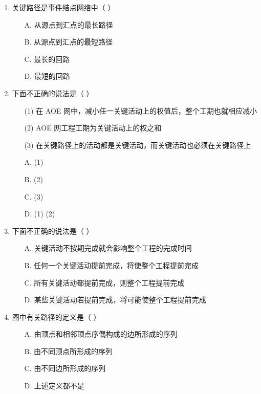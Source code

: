 \documentclass[12pt, a4paper]{article}
\begin{document}
\begin{enumerate}[label=\arabic*.]
	\item 关键路径是事件结点网络中（ ）
	      \begin{enumerate}
		      \item[A.] 从源点到汇点的最长路径
		      \item[B.] 从源点到汇点的最短路径
		      \item[C.] 最长的回路
		      \item[D.] 最短的回路
	      \end{enumerate}

	\item 下面不正确的说法是（ ）
	      \begin{enumerate}
		      \item[(1)] 在 AOE 网中，减小任一关键活动上的权值后，整个工期也就相应减小
		      \item[(2)] AOE 网工程工期为关键活动上的权之和
		      \item[(3)] 在关键路径上的活动都是关键活动，而关键活动也必须在关键路径上
		      \item[A.] (1)
		      \item[B.] (2)
		      \item[C.] (3)
		      \item[D.] (1) (2)
	      \end{enumerate}

	\item 下面不正确的说法是（ ）
	      \begin{enumerate}
		      \item[A.] 关键活动不按期完成就会影响整个工程的完成时间
		      \item[B.] 任何一个关键活动提前完成，将使整个工程提前完成
		      \item[C.] 所有关键活动都提前完成，则整个工程提前完成
		      \item[D.] 某些关键活动若提前完成，将可能使整个工程提前完成
	      \end{enumerate}

	\item 图中有关路径的定义是（ ）
	      \begin{enumerate}
		      \item[A.] 由顶点和相邻顶点序偶构成的边所形成的序列
		      \item[B.] 由不同顶点所形成的序列
		      \item[C.] 由不同边所形成的序列
		      \item[D.] 上述定义都不是
	      \end{enumerate}


\end{enumerate}
\end{document}
